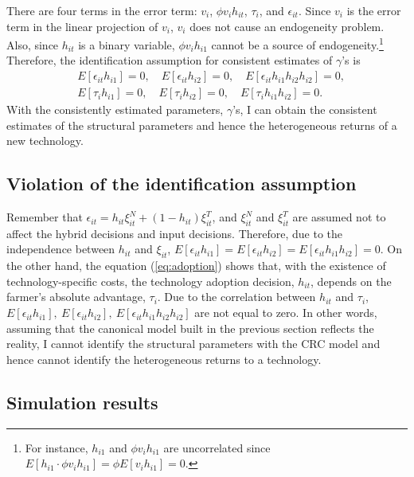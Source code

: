 \documentclass[11pt,letterpaper]{article}
\begin{document}
There are four terms in the error term: $v_i$, $\phi v_i h_{it}$, $\tau_i$, and $\epsilon_{it}$.
Since $v_i$ is the error term in the linear projection of $v_i$, $v_i$ does not cause an endogeneity problem.
Also, since $h_{it}$ is a binary variable, $\phi v_i h_{i1}$ cannot be a source of endogeneity.\footnote{
  For instance, $h_{i1}$ and $\phi v_i h_{i1}$ are uncorrelated since $E[h_{i1} \cdot \phi v_i h_{i1}] = \phi E[v_i h_{i1}] = 0$.
}
Therefore, the identification assumption for consistent estimates of $\gamma$'s is 
\begin{align}
  &E[\epsilon_{it} h_{i1}] = 0, \quad E[\epsilon_{it} h_{i2}] = 0, \quad E[\epsilon_{it} h_{i1} h_{i2} h_{i2}] = 0, \label{eq:epsilon_h} \\
  &E[\tau_i h_{i1}] = 0, \quad E[\tau_i h_{i2}] = 0, \quad E[\tau_i h_{i1} h_{i2}] = 0. \label{eq:tau_h}
\end{align}
With the consistently estimated parameters, $\gamma$'s, I can obtain the consistent estimates of the structural parameters and hence the heterogeneous returns of a new technology.

\subsection{Violation of the identification assumption}

Remember that $\epsilon_{it} = h_{it} \xi_{it}^N + (1 - h_{it}) \xi_{it}^T$, and $\xi_{it}^N$ and $\xi_{it}^T$ are assumed not to affect the hybrid decisions and input decisions.
Therefore, due to the independence between $h_{it}$ and $\xi_{it}$, $E[\epsilon_{it} h_{i1}] = E[\epsilon_{it} h_{i2}] = E[\epsilon_{it} h_{i1} h_{i2}] = 0$.
On the other hand, the equation (\ref{eq:adoption}) shows that, with the existence of technology-specific costs, the technology adoption decision, $h_{it}$, depends on the farmer's absolute advantage, $\tau_i$.
Due to the correlation between $h_{it}$ and $\tau_i$, $E[\epsilon_{it} h_{i1}], \ E[\epsilon_{it} h_{i2}], \ E[\epsilon_{it} h_{i1} h_{i2} h_{i2}]$ are not equal to zero.
In other words, assuming that the canonical model built in the previous section reflects the reality, I cannot identify the structural parameters with the CRC model and hence cannot identify the heterogeneous returns to a technology.

\subsection{Simulation results}\label{sec:sim_1}
\end{document}
